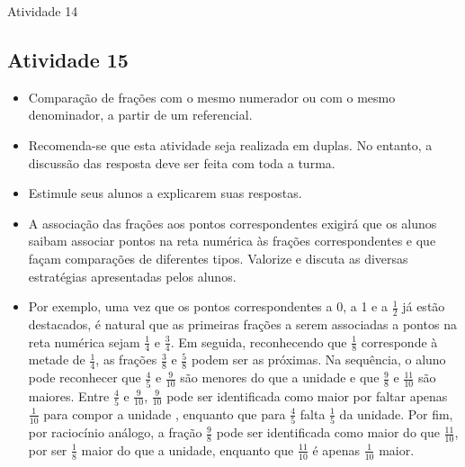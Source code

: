 \documentclass[oneside]{book}
\begin{document}
\begin{multicols}{2}
\begin{resposta*}{Atividade 14}
\end{resposta*}


\subsection{Atividade 15}
  
\begin{itemize} %
    \item       Comparação de frações com o mesmo numerador ou com o mesmo denominador, a partir de um referencial.
\end{itemize} %
  
  
\begin{itemize}
    \item       Recomenda-se que esta atividade seja realizada em duplas. No entanto, a discussão das resposta deve ser feita com toda a turma.
    \item       Estimule seus alunos a explicarem suas respostas.
    \item       A associação das frações aos pontos correspondentes exigirá que os alunos saibam associar pontos na reta numérica às frações correspondentes e que façam comparações de diferentes tipos. Valorize e discuta as diversas estratégias apresentadas pelos alunos. 
    \item       Por exemplo, uma vez que os pontos correspondentes a 0, a 1 e a       $\frac{1}{2}$       já estão destacados, é natural que as primeiras frações a serem associadas a pontos na reta numérica sejam       $\frac{1}{4}$       e       $\frac{3}{4}$. Em seguida, reconhecendo que       $\frac{1}{8}$       corresponde à metade de       $\frac{1}{4}$,  as frações       $\frac{3}{8}$       e       $\frac{5}{8}$       podem ser as próximas.  Na sequência, o aluno pode reconhecer que       $\frac{4}{5}$       e       $\frac{9}{10}$       são menores do que a unidade e que       $\frac{9}{8}$       e       $\frac{11}{10}$       são maiores.  Entre       $\frac{4}{5}$       e       $\frac{9}{10}$,       $\frac{9}{10}$       pode ser identificada como maior por faltar  apenas       $\frac{1}{10}$       para compor a unidade , enquanto que para       $\frac{4}{5}$       falta       $\frac{1}{5}$       da unidade. Por fim, por raciocínio análogo, a fração       $\frac{9}{8}$       pode ser identificada como maior do que       $\frac{11}{10}$, por ser       $\frac{1}{8}$       maior do que a unidade, enquanto que       $\frac{11}{10}$       é apenas       $\frac{1}{10}$       maior. 

\end{itemize}
\end{multicols}
\end{document}
